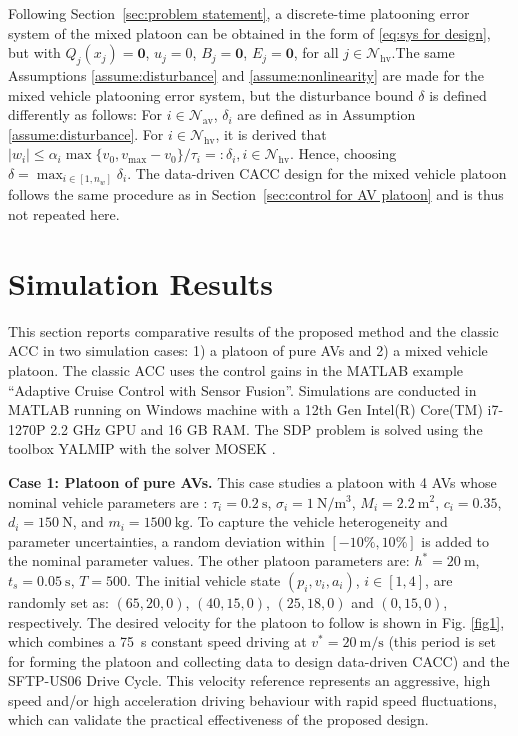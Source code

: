 \documentclass[letterpaper, 10 pt, conference]{ieeeconf}
\begin{document}
Following Section~\ref{sec:problem statement}, a discrete-time platooning error system of the mixed platoon can be obtained in the form of \eqref{eq:sys for design}, but with $Q_j(x_j) = \mathbf{0}$, $u_j = 0$, $B_j = \mathbf{0}$, $E_j = \mathbf{0}$, for all $j \in \mathcal{N}_\text{hv}$.The same Assumptions \ref{assume:disturbance} and \ref{assume:nonlinearity} are made for the mixed vehicle platooning error system, but the disturbance bound $\delta$ is defined differently as follows: For $i \in \mathcal{N}_\text{av}$, $\delta_i$ are defined as in Assumption \ref{assume:disturbance}. For  $i \in \mathcal{N}_\text{hv}$, it is derived that $|w_i| \leq \alpha_i\max \{v_0, v_{\max} - v_0\}/\tau_i =: \delta_i, i \in \mathcal{N}_\text{hv}.$	Hence, choosing $\delta = \max_{i \in [1,n_w]} \delta_i$. The data-driven CACC design for the mixed vehicle platoon follows the same procedure as in Section~\ref{sec:control for AV platoon} and is thus not repeated here.
	
\section{Simulation Results} \label{sec:simulation}
This section reports comparative results of the proposed 
method and the classic ACC \cite{Shladover+12} in two simulation cases: 1) a platoon of pure 
AVs and 2) a mixed vehicle platoon. 
The classic ACC uses the control gains in the MATLAB example ``Adaptive Cruise Control with Sensor Fusion''.
Simulations are conducted in MATLAB running on Windows machine with a 12th Gen Intel(R) Core(TM) i7-1270P 2.2 GHz GPU and 16 GB RAM. The SDP problem is solved using the toolbox YALMIP 
\cite{lofberg2004yalmip} with the solver MOSEK \cite{mosek2010mosek}.
	
\textbf{Case 1: Platoon of pure AVs.}
This case studies a platoon with 4 AVs whose nominal vehicle parameters are 
\cite{Ghasemi+13}: $\tau_i = 0.2~\mathrm{s}$, 
$\sigma_i = 1~\mathrm{N/m^3}$, $M_i = 2.2~\mathrm{m^2}$, $c_i = 0.35$, $d_i = 
150~\mathrm{N}$, and $m_i = 1500~\mathrm{kg}$. To capture the vehicle 
heterogeneity and parameter uncertainties, a random deviation within $[-10\%, 10\%]$ is added to the nominal parameter values. 
The other platoon parameters are: $h^* = 20~\mathrm{m}$, 
$t_s = 0.05~\mathrm{s}$, $T = 500$.
The initial vehicle state $(p_i,v_i,a_i)$, $i \in [1,4]$, are randomly set as: 
$(65,20,0)$, $(40,15,0)$, $(25,18,0)$ and $(0,15,0)$, respectively. 
The desired velocity for the platoon to follow is shown in Fig. \ref{fig1}, which combines a 75~s constant speed driving at $v^*=20~\mathrm{m/s}$ (this period is set for forming the platoon and collecting data to design data-driven CACC) and the SFTP-US06 Drive Cycle. This velocity reference represents an aggressive, high speed and/or high acceleration driving behaviour with rapid speed fluctuations, which can validate the practical effectiveness of the proposed design.
\end{document}
